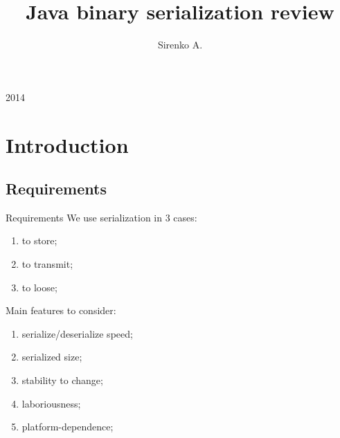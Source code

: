 \documentclass[8pt]{beamer}
\begin{document}
\title{Java binary serialization review}

\author{Sirenko A.}

\begin{frame}
  \titlepage
  \begin{center}
    2014
  \end{center}
\end{frame}

\section{Introduction}
\renewcommand{\partname}{Requirements}
\subsection{\partname}
\begin{frame}{\partname}
  We use serialization in 3 cases:
  \begin{enumerate}
    \item to store;
    \item to transmit;
    \item to loose;
  \end{enumerate}

  Main features to consider:
  \begin{enumerate}
    \item serialize/deserialize speed;
    \item serialized size;
    \item stability to change;
    \item laboriousness;
    \item platform-dependence;
  \end{enumerate}

\end{frame}

\renewcommand{\partname}{JDK tools}
\end{document}
